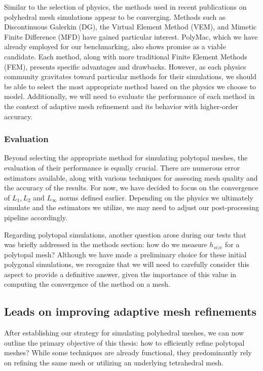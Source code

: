 \documentclass{article}
\begin{document}
Similar to the selection of physics, the methods used in recent publications on polyhedral mesh simulations appear to be converging. Methods such as Discontinuous Galerkin (DG), the Virtual Element Method (VEM), and Mimetic Finite Difference (MFD) have gained particular interest. PolyMac, which we have already employed for our benchmarking, also shows promise as a viable candidate. Each method, along with more traditional Finite Element Methods (FEM), presents specific advantages and drawbacks. However, as each physics community gravitates toward particular methods for their simulations, we should be able to select the most appropriate method based on the physics we choose to model. Additionally, we will need to evaluate the performance of each method in the context of adaptive mesh refinement and its behavior with higher-order accuracy.

\subsubsection{Evaluation}
Beyond selecting the appropriate method for simulating polytopal meshes, the evaluation of their performance is equally crucial. There are numerous error estimators available, along with various techniques for assessing mesh quality and the accuracy of the results. For now, we have decided to focus on the convergence of $L_1 , L_2$ and $L_{\infty}$ norms defined earlier. Depending on the physics we ultimately simulate and the estimators we utilize, we may need to adjust our post-processing pipeline accordingly.

Regarding polytopal simulations, another question arose during our tests that was briefly addressed in the methods section: how do we measure $h_{size}$ for a polytopal mesh? Although we have made a preliminary choice for these initial polygonal simulations, we recognize that we will need to carefully consider this aspect to provide a definitive answer, given the importance of this value in computing the convergence of the method on a mesh.

\subsection{Leads on improving adaptive mesh refinements}

After establishing our strategy for simulating polyhedral meshes, we can now outline the primary objective of this thesis: how to efficiently refine polytopal meshes? While some techniques are already functional, they predominantly rely on refining the same mesh or utilizing an underlying tetrahedral mesh.
\end{document}
